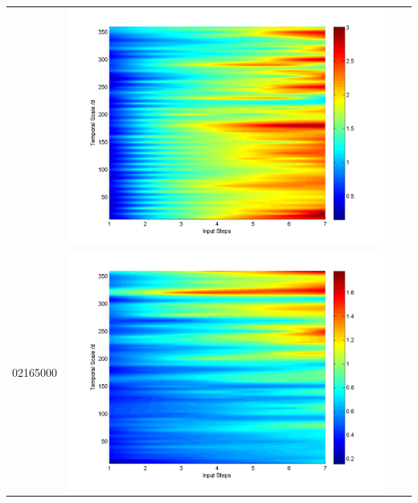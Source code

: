 \documentclass[11pt]{article}
\begin{document}
\begin{table}[H]
{\begin{tabular}{c  c   c   c  }
&\begin{minipage}{.3\textwidth}\includegraphics[width=\linewidth]{resultgraph/02143000pepq.png}\end{minipage}
\\
02165000&\begin{minipage}{.3\textwidth}\includegraphics[width=\linewidth]{resultgraph/02165000p.png}\end{minipage}

\end{tabular}}
\end{table}
\end{document}
